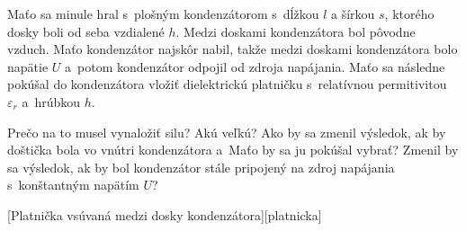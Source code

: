 Maťo sa minule hral s~plošným kondenzátorom s~dĺžkou $l$ a šírkou $s$, ktorého dosky boli od seba vzdialené $h$. 
Medzi doskami kondenzátora bol pôvodne vzduch. Maťo kondenzátor najskôr nabil, takže medzi doskami kondenzátora bolo napätie $U$ a~potom kondenzátor odpojil od zdroja napájania. Maťo sa následne pokúšal do kondenzátora vložiť dielektrickú platničku 
s~relatívnou permitivitou $\varepsilon_r$ a~hrúbkou $h$.

Prečo na to musel vynaložiť silu? Akú veľkú? Ako by sa zmenil výsledok, ak by doštička bola vo vnútri kondenzátora 
a~Maťo by sa ju pokúšal vybrať? Zmenil by sa výsledok, ak by bol kondenzátor stále pripojený na zdroj napájania s~konštantným napätím $U$?

[Platnička vsúvaná medzi dosky kondenzátora][platnicka]
